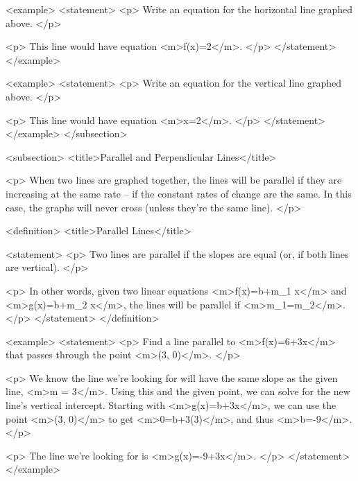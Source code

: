         <example>
            <statement>
                <p>
                    Write an equation for the horizontal line graphed above.
                </p>

                <p>
                    This line would have equation <m>f(x)=2</m>.
                </p>
            </statement>
        </example>

        <example>
            <statement>
                <p>
                    Write an equation for the vertical line graphed above.
                </p>

                <p>
                    This line would have equation <m>x=2</m>.
                </p>
            </statement>
        </example>
    </subsection>


    <subsection>
        <title>Parallel and Perpendicular Lines</title>

        <p>
            When two lines are graphed together, the lines will be parallel if they are increasing at the same rate – if the constant rates of change are the same.
            In this case, the graphs will never cross (unless they’re the same line).
        </p>

        <definition>
            <title>Parallel Lines</title>

            <statement>
                <p>
                    Two lines are parallel if the slopes are equal (or, if both lines are vertical).
                </p>

                <p>
                    In other words, given two linear equations <m>f(x)=b+m_{1} x</m> and <m>g(x)=b+m_{2} x</m>, the lines will be parallel if <m>m_{1}=m_{2}</m>.
                </p>
            </statement>
        </definition>

        <example>
            <statement>
                <p>
                    Find a line parallel to <m>f(x)=6+3x</m> that passes through the point <m>(3, 0)</m>.
                </p>

                <p>
                    We know the line we’re looking for will have the same slope as the given line, <m>m = 3</m>.
                    Using this and the given point, we can solve for the new line’s vertical intercept.
                    Starting with <m>g(x)=b+3x</m>, we can use the point <m>(3, 0)</m> to get <m>0=b+3(3)</m>, and thus <m>b=-9</m>.
                </p>

                <p>
                    The line we’re looking for is <m>g(x)=-9+3x</m>.
                </p>
            </statement>
        </example>

